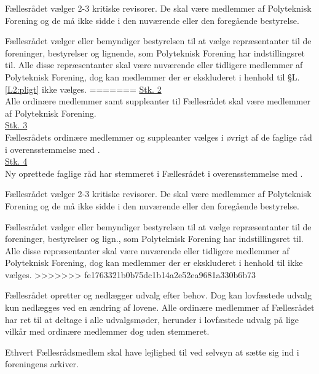 \begin{list}
\item Fællesrådet vælger 2-3 kritiske revisorer. De skal være medlemmer af Polyteknisk Forening og de må ikke sidde i den nuværende eller den foregående bestyrelse. 

\item Fællesrådet vælger eller bemyndiger bestyrelsen til at vælge repræsentanter til de foreninger, bestyrelser og lignende, som Polyteknisk Forening har indstillingsret til. Alle disse repræsentanter skal være nuværende eller tidligere medlemmer af Polyteknisk Forening, dog kan medlemmer der er ekskluderet i henhold til §L.\ref{L2:pligt} ikke vælges.
=======
\underline{Stk. 2}\\
Alle ordinære medlemmer samt suppleanter til Fællesrådet skal være medlemmer af Polyteknisk Forening.\\

\underline{Stk. 3}\\
Fællesrådets ordinære medlemmer og suppleanter vælges i øvrigt af de faglige råd i overensstemmelse med .\\

\underline{Stk. 4}\\
Ny oprettede faglige råd har stemmeret i Fællesrådet i overensstemmelse med .

\item Fællesrådet vælger 2-3 kritiske revisorer. De skal være medlemmer af Polyteknisk Forening og de må ikke sidde i den nuværende eller den foregående bestyrelse. 

\item Fællesrådet vælger eller bemyndiger bestyrelsen til at vælge repræsentanter til de foreninger, bestyrelser og lign., som Polyteknisk Forening har indstillingsret til. Alle disse repræsentanter skal være nuværende eller tidligere medlemmer af Polyteknisk Forening, dog kan medlemmer der er ekskluderet i henhold til  ikke vælges.
>>>>>>> fe1763321b0b75dc1b14a2e52ea9681a330b6b73

\item Fællesrådet opretter og nedlægger udvalg efter behov. Dog kan lovfæstede udvalg kun nedlægges ved en ændring af lovene. Alle ordinære medlemmer af Fællesrådet har ret til at deltage i alle udvalgsmøder, herunder i lovfæstede udvalg på lige vilkår med ordinære medlemmer dog uden stemmeret.

\item Ethvert Fællesrådsmedlem skal have lejlighed til ved selvsyn at sætte sig ind i foreningens arkiver.


\end{list}
